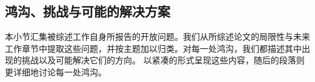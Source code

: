 
\subsection{鸿沟、挑战与可能的解决方案}
\label{subsec:gaps}
本小节汇集被综述工作自身所报告的开放问题。我们从所综述论文的局限性与未来工作章节中提取这些问题，并按主题加以归类。对每一处鸿沟，我们都描述其中出现的挑战以及可能解决它们的方向。 以紧凑的形式呈现这些内容，随后的段落则更详细地讨论每一处鸿沟。

